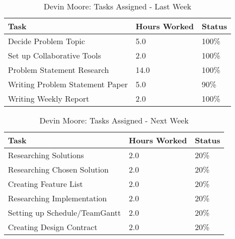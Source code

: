 \documentclass[12pt,article,compsoc]{IEEEtran}
\begin{document}
	\begin{table}[ht]
	\renewcommand{\arraystretch}{1.3}
		\caption{Devin Moore: Tasks Assigned - Last Week}
		
		\label{Summary of Devin Moore's activities: last week}
		
		\centering
		\begin{tabular}{p{5.5cm}|p{1cm}|p{1cm}}

		\hline
		\bfseries 	Task		 		& \bfseries Hours Worked	& \bfseries Status	\\
		\hline\hline
					Decide Problem Topic		& 5.0					& 100\%				\\	%
					Set up Collaborative Tools	& 2.0					& 100\%				\\
					Problem Statement Research	& 14.0					& 100\%				\\
					Writing Problem Statement Paper	& 5.0				& 90\%				\\
					Writing Weekly Report		& 2.0					& 100\%				\\	
		\hline
		\end{tabular}
	\end{table}

	\begin{table}[ht]
	\renewcommand{\arraystretch}{1.3}
		\caption{Devin Moore: Tasks Assigned - Next Week}
		
		\label{Summary of Devin Moore's activites: this week}
		
		\centering
		\begin{tabular}{p{5.5cm}|p{1cm}|p{1cm}}

		\hline
		\bfseries 	Task		 		& \bfseries Hours Worked	& \bfseries Status	\\
		\hline\hline
					Researching Solutions			& 2.0						& 20\%				\\	%
					Researching Chosen Solution		& 2.0						& 20\%			\\
					Creating Feature List		 	& 2.0						& 20\%			\\
					Researching Implementation		& 2.0						& 20\%			\\
					Setting up Schedule/TeamGantt	& 2.0						& 20\%			\\
					Creating Design Contract		& 2.0						& 20\%			\\	
		\hline
		\end{tabular}
	\end{table}
\end{document}

